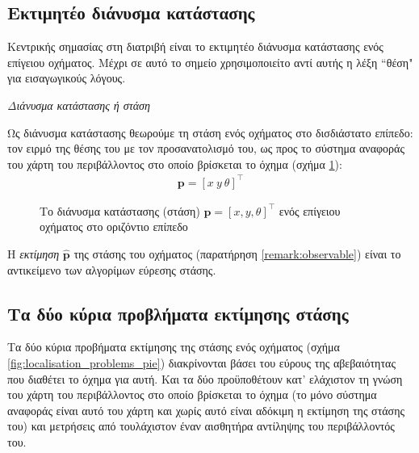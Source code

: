 \subsection{Εκτιμητέο διάνυσμα κατάστασης}

Κεντρικής σημασίας στη διατριβή είναι το εκτιμητέο διάνυσμα κατάστασης ενός
επίγειου οχήματος. Μέχρι σε αυτό το σημείο χρησιμοποιείτο αντί αυτής η λέξη
``θέση" για εισαγωγικούς λόγους.

\begin{bw_box}
\begin{definition}
  \textit{Διάνυσμα κατάστασης ή στάση}

Ως διάνυσμα κατάστασης θεωρούμε τη στάση ενός οχήματος στο δισδιάστατο επίπεδο:
τον ειρμό της θέσης του με τον προσανατολισμό του, ως προς το σύστημα αναφοράς
του χάρτη του περιβάλλοντος στο οποίο βρίσκεται το όχημα (σχήμα
\ref{fig:pose_figure}):
  \begin{align}
    \bm{p} = [x \ y \ \theta]^\top
\end{align}

\end{definition}
\end{bw_box}

\begin{figure}[htbp]\centering
  
  \caption{\small Το διάνυσμα κατάστασης (στάση) $\bm{p} = [x,y,\theta]^\top$
    ενός επίγειου οχήματος στο οριζόντιο επίπεδο}
  \label{fig:pose_figure}
\end{figure}

Η \textit{εκτίμηση} $\hat{\bm{p}}$ της στάσης του οχήματος (παρατήρηση
\ref{remark:observable}) είναι το αντικείμενο των αλγορίμων εύρεσης στάσης.



\subsection{Τα δύο κύρια προβλήματα εκτίμησης στάσης}

Τα δύο κύρια προβήματα εκτίμησης της στάσης ενός οχήματος (σχήμα
\ref{fig:localisation_problems_pie}) διακρίνονται βάσει του εύρους της
αβεβαιότητας που διαθέτει το όχημα για αυτή.  Και τα δύο προϋποθέτουν
κατ' ελάχιστον τη γνώση του χάρτη του περιβάλλοντος στο οποίο
βρίσκεται το όχημα (το μόνο σύστημα αναφοράς είναι αυτό του χάρτη και χωρίς
αυτό είναι αδόκιμη η εκτίμηση της στάσης του) και μετρήσεις από τουλάχιστον
έναν αισθητήρα αντίληψης του περιβάλλοντός του.

